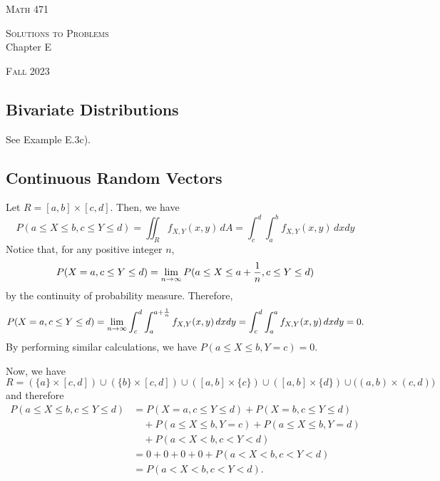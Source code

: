 


\hrulefill

\begin{minipage}{0.33\textwidth}
\textsc{Math 471}
\end{minipage} \hfill 
\begin{minipage}{0.32\textwidth}
\centering
\textsc{Solutions to Problems} \\
Chapter E
\end{minipage}
 \hfill 
 \begin{minipage}{0.33\textwidth}
 \flushright \textsc{Fall 2023}
 \end{minipage}

\hrulefill

\setcounter{section}{5}

\subsection{Bivariate Distributions}

\begin{problem}
See Example E.3c).
\end{problem}

\subsection{Continuous Random Vectors}

\begin{problem}
Let $R = [a, b] \times [c, d]$. Then, we have
    \[
        P (a \leq X \leq b , c \leq Y \leq d ) = \iint_R f_{X, Y} (x, y) \, dA = \int_c^d \int_a^b f_{X, Y} (x, y) \, dx dy
    \]
Notice that, for any positive integer $n$,
    \[
        P (X = a , c \leq Y \leq d ) = \lim_{n \rightarrow \infty} P (a \leq X \leq a + \frac{1}{n}, c \leq Y \leq d )
    \]
by the continuity of probability measure. Therefore, 
    \[
        P (X = a , c \leq Y \leq d ) = \lim_{n \rightarrow \infty} \int_c^d \int_a^{a + \frac{1}{n}} f_{X, Y} (x, y) \, dx dy = \int_c^d \int_a^a f_{X, Y} (x, y) \, dx dy = 0 .
    \]
By performing similar calculations, we have $P (a \leq X \leq b , Y = c ) = 0$. 

Now, we have    
    \[
        R = (\{ a \} \times [c, d] ) \cup ( \{ b \} \times [c, d] ) \cup ( [a, b] \times \{ c \} ) \cup ([a, b] \times \{ d \} ) \cup \big( (a, b) \times (c, d) \big)
    \]
and therefore
    \begin{align*}
        P (a \leq X \leq b , c \leq Y \leq d ) &= P (X = a , c \leq Y \leq d ) + P (X = b , c \leq Y \leq d )  \\ 
        & \quad + P (a \leq X \leq b , Y = c) + P (a \leq X \leq b , Y = d ) \\ 
        & \quad + P (a < X < b , c < Y < d ) \\ 
        &= 0 + 0 + 0 + 0 + P (a < X < b , c < Y < d ) \\ 
        &= P (a < X < b , c < Y < d ) . \tag*{$\square$}
    \end{align*}
\end{problem}


